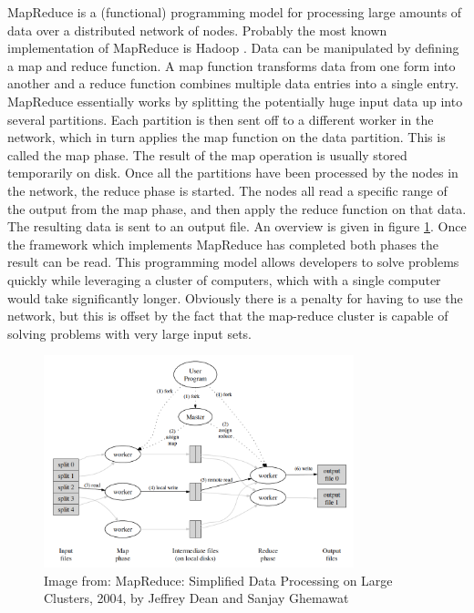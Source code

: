 MapReduce is a (functional) programming model for processing large amounts of
data over a distributed network of nodes. Probably the most known implementation
of MapReduce is Hadoop \cite{Hadoop}. Data can be manipulated by defining a map
and reduce function. A map function transforms data from one form into another
and a reduce function combines multiple data entries into a single entry.
MapReduce essentially works by splitting the potentially huge input data up into
several partitions. Each partition is then sent off to a different worker in the
network, which in turn applies the map function on the data partition. This is
called the map phase. The result of the map operation is usually stored
temporarily on disk. Once all the partitions have been processed by the nodes in
the network, the reduce phase is started. The nodes all read a specific range of
the output from the map phase, and then apply the reduce function on that data.
The resulting data is sent to an output file. An overview is given in figure
\ref{fig:mapreduce}. Once the framework which implements MapReduce has completed
both phases the result can be read. This programming model allows developers to
solve problems quickly while leveraging a cluster of computers, which with a
single computer would take significantly longer. Obviously there is a penalty
for having to use the network, but this is offset by the fact that the
map-reduce cluster is capable of solving problems with very large input sets.

\begin{figure}[htb] 
\includegraphics[width=340px]{mapreduce.png} 
\caption{Image from: MapReduce: Simplified Data Processing on Large Clusters, 2004, by Jeffrey Dean and Sanjay Ghemawat} \label{fig:mapreduce} 
\end{figure}
